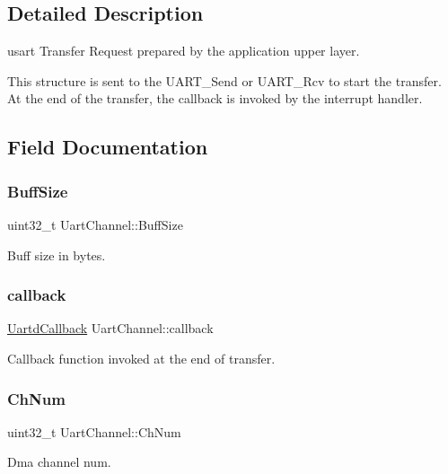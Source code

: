 \subsection{Detailed Description}
usart Transfer Request prepared by the application upper layer. 

This structure is sent to the U\+A\+R\+T\+\_\+\+Send or U\+A\+R\+T\+\_\+\+Rcv to start the transfer. At the end of the transfer, the callback is invoked by the interrupt handler. 

\subsection{Field Documentation}
\mbox{\label{structUartChannel_a97dc7f4ec156e8a4620f9ed76462aeec}} 
\subsubsection{\texorpdfstring{BuffSize}{BuffSize}}
{\footnotesize\ttfamily uint32\+\_\+t Uart\+Channel\+::\+Buff\+Size}

Buff size in bytes. \mbox{\label{structUartChannel_a7a073f156cda41c0b3d3546d7b172c63}} 
\subsubsection{\texorpdfstring{callback}{callback}}
{\footnotesize\ttfamily \mbox{\hyperlink{uart__dma_8h_a31d6530d0dbbe2541129f24aa1fa4e72}{Uartd\+Callback}} Uart\+Channel\+::callback}

Callback function invoked at the end of transfer. \mbox{\label{structUartChannel_afb54680c49c6d94b9f873b78a63c6481}} 
\subsubsection{\texorpdfstring{ChNum}{ChNum}}
{\footnotesize\ttfamily uint32\+\_\+t Uart\+Channel\+::\+Ch\+Num}

Dma channel num. \mbox{\label{structUartChannel_a3bfbed91e43b7dd198182be59be7875b}} 
